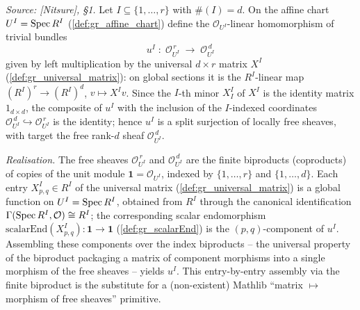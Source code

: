 \begin{definition}\leanok
  \label{def:gr_chart_quotient}
  \textit{Source: [Nitsure], \S 1.}
  Let \(I \subseteq \{1,\dots,r\}\) with \(\#(I) = d\). On the affine chart
  \(U^I = \operatorname{Spec} R^I\) (\cref{def:gr_affine_chart}) define the
  \(\mathcal{O}_{U^I}\)-linear homomorphism of trivial bundles
  \[
    u^I \;:\; \mathcal{O}_{U^I}^{\,r}
      \;\longrightarrow\; \mathcal{O}_{U^I}^{\,d}
  \]
  given by left multiplication by the universal \(d \times r\) matrix \(X^I\)
  (\cref{def:gr_universal_matrix}): on global sections it is the \(R^I\)-linear
  map \((R^I)^{r} \to (R^I)^{d}\), \(v \mapsto X^I v\). Since the \(I\)-th minor
  \(X^I_I\) of \(X^I\) is the identity matrix \(1_{d \times d}\), the composite of
  \(u^I\) with the inclusion of the \(I\)-indexed coordinates
  \(\mathcal{O}_{U^I}^{\,d} \hookrightarrow \mathcal{O}_{U^I}^{\,r}\) is the
  identity; hence \(u^I\) is a split surjection of locally free sheaves, with
  target the free rank-\(d\) sheaf \(\mathcal{O}_{U^I}^{\,d}\).

  \emph{Realisation.} The free sheaves \(\mathcal{O}_{U^I}^{\,r}\) and
  \(\mathcal{O}_{U^I}^{\,d}\) are the finite biproducts (coproducts) of copies of
  the unit module \(\mathbf{1} = \mathcal{O}_{U^I}\), indexed by \(\{1,\dots,r\}\)
  and \(\{1,\dots,d\}\). Each entry \(X^I_{p,q} \in R^I\) of the universal matrix
  (\cref{def:gr_universal_matrix}) is a global function on \(U^I = \operatorname{Spec} R^I\),
  obtained from \(R^I\) through the canonical identification
  \(\Gamma(\operatorname{Spec} R^I, \mathcal{O}) \cong R^I\); the corresponding scalar
  endomorphism \(\mathrm{scalarEnd}(X^I_{p,q}) : \mathbf{1} \to \mathbf{1}\)
  (\cref{def:gr_scalarEnd}) is the \((p,q)\)-component of \(u^I\). Assembling these
  components over the index biproducts -- the universal property of the biproduct
  packaging a matrix of component morphisms into a single morphism of the free
  sheaves -- yields \(u^I\). This entry-by-entry assembly via the finite biproduct
  is the substitute for a (non-existent) Mathlib ``matrix \(\mapsto\) morphism of
  free sheaves'' primitive.
\end{definition}


